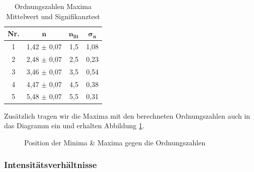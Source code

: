 \documentclass{article}
\begin{document}
\begin{table}[!h]
    \centering
    \begin{tabular}{cccc}
        \hline
        \textbf{Nr.} & $\bm{\overline{n}}$ & $\bm{n_{lit}}$ & $\bm{\sigma_n}$ \\ \hline
             1 & 1,42 $\pm$ 0,07 &   1,5 &  1,08 \\
             2 & 2,48 $\pm$ 0,07 &   2,5 &  0,23 \\
             3 & 3,46 $\pm$ 0,07 &   3,5 &  0,54 \\
             4 & 4,47 $\pm$ 0,07 &   4,5 &  0,38 \\
             5 & 5,48 $\pm$ 0,07 &   5,5 &  0,31 \\ \hline
    \end{tabular}%
    \caption{Ordnungszahlen Maxima Mittelwert und Signifikanztest}
    \label{tab:Einzelsp_Ordn_Maxima_mean}
\end{table}

\phantom{.}

Zusätzlich tragen wir die Maxima mit den berechneten Ordnungszahlen auch in das Diagramm ein und erhalten Abbildung \ref{fig:Pos-Ordn_Min_Max}.

\begin{figure}[!b]
    \centering
    \caption{Position der Minima \& Maxima gegen die Ordnungszahlen}
    \label{fig:Pos-Ordn_Min_Max}
\end{figure}

\clearpage
\subsubsection{Intensitätsverhältnisse}
\end{document}
